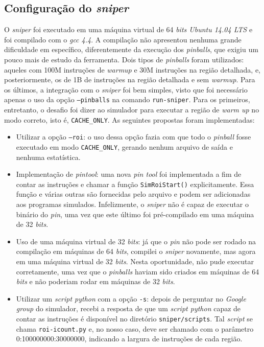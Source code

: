 \documentclass[12pt]{article}
\begin{document}
\subsection{Configuração do \textit{sniper}}

O \textit{sniper} foi executado em uma máquina virtual de 64 \textit{bits
Ubuntu 14.04 LTS} e foi compilado com o \textit{gcc 4.4}. A compilação não
apresentou nenhuma grande dificuldade em específico, diferentemente da execução
dos \textit{pinballs}, que exigiu um pouco mais de estudo da ferramenta. Dois
tipos de \textit{pinballs} foram utilizados: aqueles com 100M instruções de
\textit{warmup} e 30M instruções na região detalhada, e, posteriormente, os de
1B de instruções na região detalhada e sem \textit{warmup}. Para os últimos, a
integração com o \textit{sniper} foi bem simples, visto que foi necessário
apenas o uso da opção \texttt{--pinballs} na comando \texttt{run-sniper}. Para
os primeiros, entretanto, o desafio foi dizer ao simulador para executar a
região de \textit{warm up} no modo correto, isto é, \texttt{CACHE\_ONLY}. As
seguintes propostas foram implementadas:

\begin {itemize}
	\item Utilizar a opção \texttt{--roi}: o uso dessa opção fazia com que todo o
	\textit{pinball} fosse executado em modo \texttt{CACHE\_ONLY}, gerando nenhum
	arquivo de saída e nenhuma estatística.
	\item Implementação de \textit{pintool}: uma nova \textit{pin tool} foi
	implementada a fim de contar as instruções e chamar a função
	\texttt{SimRoiStart()} explicitamente. Essa função e várias outras são
	fornecidas pelo arquivo  e podem ser adicionadas
	aos programas simulados. Infelizmente, o \textit{sniper} não é capaz de
	executar o binário do \textit{pin}, uma vez que este último foi pré-compilado
	em uma máquina de 32 \textit{bits}.
	\item Uso de uma máquina virtual de 32 \textit{bits}: já que o \textit{pin} não
	pode ser rodado na compilação em máquinas de 64 \textit{bits}, compilei o
	\textit{sniper} novamente, mas agora em uma máquina virtual de 32
	\textit{bits}. Nesta oportunidade, não pude executar corretamente, uma vez que
	o \textit{pinballs} haviam sido criados em máquinas de 64 \textit{bits} e não
	poderiam rodar em máquinas de 32 \textit{bits}.
	\item Utilizar um \textit{script python} com a opção \texttt{-s}: depois de
	perguntar no \textit{Google group} do simulador, recebi a resposta de que um
	\textit{script python} capaz de contar as instruções é disponível no diretório
	\texttt{sniper/scripts}. Tal \textit{script} se chama \texttt{roi-icount.py} e,
	no nosso caso, deve ser chamado com o parâmetro 0:100000000:30000000, indicando
	a largura de instruções de cada região.
\end{itemize}
\end{document}
